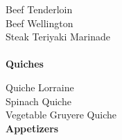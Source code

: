 \documentclass[11pt, twoside, openany]{book}
\begin{document}
Beef Tenderloin\hrulefill\pageref{beef-tenderloin}\\
Beef Wellington\hrulefill\pageref{beef-wellington}\\
Steak Teriyaki Marinade\hrulefill\pageref{steak-teriyaki-marinade}\\
{~\vspace{2mm}\\ \Large \textbf{Quiches}}\hfill\textbf{\pageref{quiches}}

Quiche Lorraine\hrulefill\pageref{quiche-lorraine}\\
Spinach Quiche\hrulefill\pageref{spinach-quiche}\\
Vegetable Gruyere Quiche\hrulefill\pageref{vegetable-gruyere-quiche}\\
{\newpage \LARGE \textbf{Appetizers}} \label{appetizers}\vspace{4mm}\\
\end{document}
